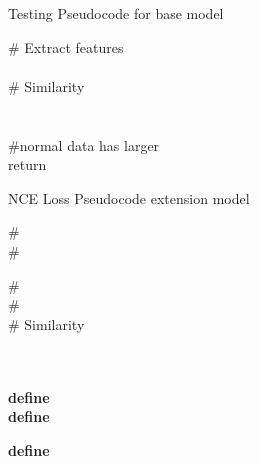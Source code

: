 \documentclass[journal]{IEEEtran}
\theoremstyle{remark}
\begin{document}
\begin{algorithm}
  \caption{Testing Pseudocode for base model}
  \label{alg::Testing Pseudocode basic model}  
  \footnotesize
    {
        {
            \# Extract features\\
            \\
        }
        {   
            \# Similarity\\
            \\
             \\
            \#normal data has larger  \\
        }
    }
    return 
\end{algorithm}

\begin{algorithm}
  \caption{NCE Loss Pseudocode extension model}
  \label{alg::NCE Loss Pseudocode extension model} 
  \footnotesize


  \# \\
  \# \\
  {
        {   
            \# \\
            \# \\
            \# Similarity\\
            \\
             \\
        }
        
        \textbf{define} \\
        \textbf{define} 
        
        \textbf{define} \\
        \\
    }
     
\end{algorithm}
\end{document}
